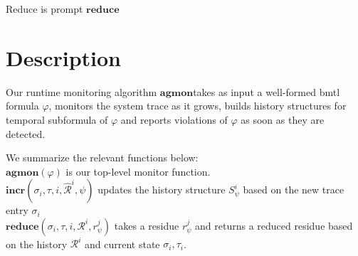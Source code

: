 \documentclass[10pt,a4paper]{article}
\newcommand{\res}[2]{\ensuremath{r_{#1}^{#2}}}
\newcommand{\agmon}{\ensuremath{\mathbf{agmon}}}
\begin{document}
Reduce is prompt $\mathbf{reduce}$


\section{Description}
Our runtime monitoring algorithm \agmon takes as input a well-formed bmtl formula $\varphi$, monitors the system trace as it grows, builds history structures for temporal subformula of $\varphi$ and reports violations of $\varphi$ as soon as they are detected.

We summarize the relevant functions below: \\
$\agmon(\varphi)$ is our top-level monitor function. \\
$\mathbf{incr}(\sigma_i, \tau, i, \hat{\mathcal{R}}^i, \psi)$ updates the history structure $S^i_{\psi}$ based on the new trace entry $\sigma_i$ \\ 
$\mathbf{reduce}(\sigma_i,\tau, i, \mathcal{R}^i, \res{\psi}{j})$ takes a residue $\res{\psi}{j}$ and returns a reduced residue based on the history $\mathcal{R}^i$ and current state $\sigma_i, \tau_i$. 
\end{document}
